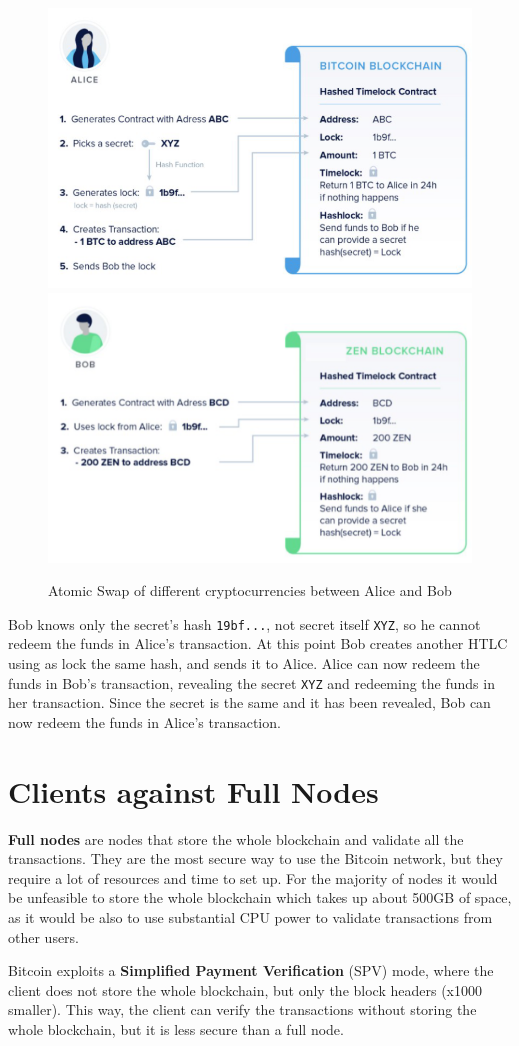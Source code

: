 \begin{figure}[htbp]
   \centering
   \includegraphics[width=0.49\columnwidth]{images/bitcoin_htlc1.png}
   \includegraphics[width=0.49\columnwidth]{images/bitcoin_htlc2.png}
   \caption{Atomic Swap of different cryptocurrencies between Alice and Bob}
   \label{fig:bitcoin_htlc}
\end{figure}

Bob knows only the secret's hash \texttt{19bf...}, not secret itself \texttt{XYZ}, so he cannot redeem the funds in Alice's transaction. At this point Bob creates another HTLC using as lock the same hash, and sends it to Alice. Alice can now redeem the funds in Bob's transaction, revealing the secret \texttt{XYZ} and redeeming the funds in her transaction.
Since the secret is the same and it has been revealed, Bob can now redeem the funds in Alice's transaction.

\section{Clients against Full Nodes}
\textbf{Full nodes} are nodes that store the whole blockchain and validate all the transactions. They are the most secure way to use the Bitcoin network, but they require a lot of resources and time to set up.
For the majority of nodes it would be unfeasible to store the whole blockchain which takes up about 500GB of space, as it would be also to use substantial CPU power to validate transactions from other users.

Bitcoin exploits a \textbf{Simplified Payment Verification} (SPV) mode, where the client does not store the whole blockchain, but only the block headers (x1000 smaller). This way, the client can verify the transactions without storing the whole blockchain, but it is less secure than a full node.

